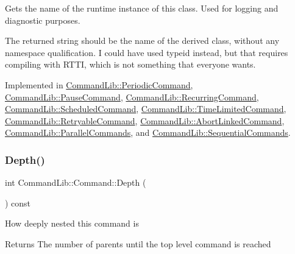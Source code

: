 Gets the name of the runtime instance of this class. Used for logging and diagnostic purposes. 

The returned string should be the name of the derived class, without any namespace qualification. I could have used typeid instead, but that requires compiling with R\+T\+TI, which is not something that everyone wants. 

Implemented in \mbox{\hyperlink{class_command_lib_1_1_periodic_command_a77c34a0f31ae4e7f0c642a356bd5d6ef}{Command\+Lib\+::\+Periodic\+Command}}, \mbox{\hyperlink{class_command_lib_1_1_pause_command_afcdddf1fa8b52a3bfec665b1db736cc5}{Command\+Lib\+::\+Pause\+Command}}, \mbox{\hyperlink{class_command_lib_1_1_recurring_command_a4e2073b92185dd5f7b545d774afbb929}{Command\+Lib\+::\+Recurring\+Command}}, \mbox{\hyperlink{class_command_lib_1_1_scheduled_command_ae01bdda88e63460a380579e08ced9eda}{Command\+Lib\+::\+Scheduled\+Command}}, \mbox{\hyperlink{class_command_lib_1_1_time_limited_command_a2a5063ef124f555229b90f7bd82f362e}{Command\+Lib\+::\+Time\+Limited\+Command}}, \mbox{\hyperlink{class_command_lib_1_1_retryable_command_ace5c335248d89b0bf162de17a9579a74}{Command\+Lib\+::\+Retryable\+Command}}, \mbox{\hyperlink{class_command_lib_1_1_abort_linked_command_a014c2c8177e18e27f651aa122b58c90e}{Command\+Lib\+::\+Abort\+Linked\+Command}}, \mbox{\hyperlink{class_command_lib_1_1_parallel_commands_aada3d28f970e82d1d057ac2b499453ac}{Command\+Lib\+::\+Parallel\+Commands}}, and \mbox{\hyperlink{class_command_lib_1_1_sequential_commands_abbfd93499d508c3f0d2d817bd59e7080}{Command\+Lib\+::\+Sequential\+Commands}}.

\mbox{\label{class_command_lib_1_1_command_a28e3c6c7f6467cbeffe287984c3f012d}} 
\subsubsection{\texorpdfstring{Depth()}{Depth()}}
{\footnotesize\ttfamily int Command\+Lib\+::\+Command\+::\+Depth (\begin{DoxyParamCaption}{ }\end{DoxyParamCaption}) const}



How deeply nested this command is

\begin{DoxyReturn}{Returns}
The number of parents until the top level command is reached 
\end{DoxyReturn}


